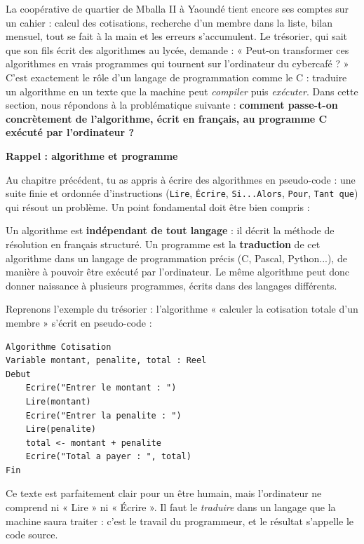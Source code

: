 \documentclass[11pt]{article}
\newcommand{\cle}[1]{{\popxbold\color{popdark}#1}}
\newcounter{popsec}
\newcounter{popsub}
\newcommand{\courssub}[1]{%
  \stepcounter{popsub}%
  \par\vspace{9pt}\noindent{\popxbold\fontsize{11.5}{13}\selectfont\color{popink}{\color{poporange}\thepopsec.\thepopsub}\hspace{6pt}#1}\par\nopagebreak\vspace{4pt}
}
\begin{document}
La coopérative de quartier de Mballa II à Yaoundé tient encore ses comptes sur un cahier : calcul des cotisations, recherche d'un membre dans la liste, bilan mensuel, tout se fait à la main et les erreurs s'accumulent. Le trésorier, qui sait que son fils écrit des algorithmes au lycée, demande : « Peut-on transformer ces algorithmes en vrais programmes qui tournent sur l'ordinateur du cybercafé ? » C'est exactement le rôle d'un \cle{langage de programmation} comme le C : traduire un algorithme en un texte que la machine peut \emph{compiler} puis \emph{exécuter}. Dans cette section, nous répondons à la problématique suivante : \textbf{comment passe-t-on concrètement de l'algorithme, écrit en français, au programme C exécuté par l'ordinateur ?}

\courssub{De l'algorithme au programme}

\textbf{Rappel : algorithme et programme}\par

Au chapitre précédent, tu as appris à écrire des algorithmes en pseudo-code : une suite finie et ordonnée d'instructions (\texttt{Lire}, \texttt{Écrire}, \texttt{Si...Alors}, \texttt{Pour}, \texttt{Tant que}) qui résout un problème. Un point fondamental doit être bien compris :

\begin{aretenir}
Un \cle{algorithme} est \textbf{indépendant de tout langage} : il décrit la méthode de résolution en français structuré. Un \cle{programme} est la \textbf{traduction} de cet algorithme dans un langage de programmation précis (C, Pascal, Python...), de manière à pouvoir être exécuté par l'ordinateur. Le même algorithme peut donc donner naissance à plusieurs programmes, écrits dans des langages différents.
\end{aretenir}

Reprenons l'exemple du trésorier : l'algorithme « calculer la cotisation totale d'un membre » s'écrit en pseudo-code :

\begin{lstlisting}
Algorithme Cotisation
Variable montant, penalite, total : Reel
Debut
    Ecrire("Entrer le montant : ")
    Lire(montant)
    Ecrire("Entrer la penalite : ")
    Lire(penalite)
    total <- montant + penalite
    Ecrire("Total a payer : ", total)
Fin
\end{lstlisting}

Ce texte est parfaitement clair pour un être humain, mais l'ordinateur ne comprend ni « Lire » ni « Écrire ». Il faut le \emph{traduire} dans un langage que la machine saura traiter : c'est le travail du programmeur, et le résultat s'appelle le \cle{code source}.
\end{document}
